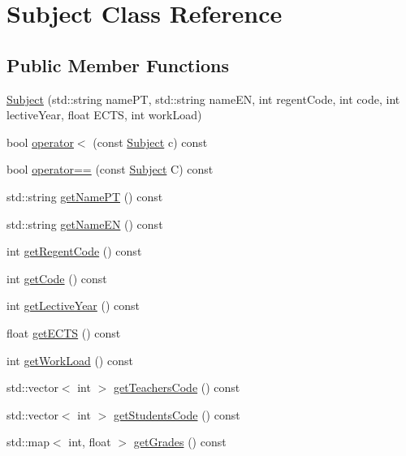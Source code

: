 \hypertarget{classSubject}{}\section{Subject Class Reference}
\label{classSubject}
\subsection*{Public Member Functions}
\begin{DoxyCompactItemize}
\item 
\hyperlink{classSubject_a6fd4f94feaeb80fb410278015b38ad94}{Subject} (std\+::string name\+PT, std\+::string name\+EN, int regent\+Code, int code, int lective\+Year, float E\+C\+TS, int work\+Load)
\item 
bool \hyperlink{classSubject_a2ba88df904eeb87b136764898ea3a1fc}{operator$<$} (const \hyperlink{classSubject}{Subject} c) const
\item 
bool \hyperlink{classSubject_acc7e7e8b0665e05dd9f0d78a6d79468f}{operator==} (const \hyperlink{classSubject}{Subject} C) const
\item 
std\+::string \hyperlink{classSubject_a4fb200b5b33dab2166a9a1ee6dbe7443}{get\+Name\+PT} () const
\item 
std\+::string \hyperlink{classSubject_a9419a1c4e2248fee00baf3885655ba49}{get\+Name\+EN} () const
\item 
int \hyperlink{classSubject_afbdb9379e3d0ceb44b838cf113931a23}{get\+Regent\+Code} () const
\item 
int \hyperlink{classSubject_a2d962550a5b15b5cdf3eb0d8892957f8}{get\+Code} () const
\item 
int \hyperlink{classSubject_ad03c422fb716222b2c49c41b7506827a}{get\+Lective\+Year} () const
\item 
float \hyperlink{classSubject_a1395a7f637471df28cc72b8b746350d1}{get\+E\+C\+TS} () const
\item 
int \hyperlink{classSubject_a628fc24fd443deb1ab62e4dc05e8ec25}{get\+Work\+Load} () const
\item 
std\+::vector$<$ int $>$ \hyperlink{classSubject_ab82fbd086ac1f72b52fbaa2143558eeb}{get\+Teachers\+Code} () const
\item 
std\+::vector$<$ int $>$ \hyperlink{classSubject_a668e1cc5e5b0a6422d58134fae5aae7e}{get\+Students\+Code} () const
\item 
std\+::map$<$ int, float $>$ \hyperlink{classSubject_ac9837d37f7d4e94759622e736a5b4ff9}{get\+Grades} () const
\item 

\end{DoxyCompactItemize}
